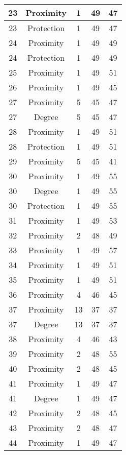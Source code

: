 \documentclass[results.tex]{subfiles}
\begin{document}
\begin{center}
\begin{tabular}{| c || c | c | c | c |}
    \hline
    23 & Proximity & 1 & 49 & 47 \\ 
    \hline
    23 & Protection & 1 & 49 & 47 \\ 
    \hline
    24 & Proximity & 1 & 49 & 49 \\ 
    \hline
    24 & Protection & 1 & 49 & 49 \\ 
    \hline
    25 & Proximity & 1 & 49 & 51 \\ 
    \hline
    26 & Proximity & 1 & 49 & 45 \\ 
    \hline
    27 & Proximity & 5 & 45 & 47 \\ 
    \hline
    27 & Degree & 5 & 45 & 47 \\ 
    \hline
    28 & Proximity & 1 & 49 & 51 \\ 
    \hline
    28 & Protection & 1 & 49 & 51 \\ 
    \hline
    29 & Proximity & 5 & 45 & 41 \\ 
    \hline
    30 & Proximity & 1 & 49 & 55 \\ 
    \hline
    30 & Degree & 1 & 49 & 55 \\ 
    \hline
    30 & Protection & 1 & 49 & 55 \\ 
    \hline
    31 & Proximity & 1 & 49 & 53 \\ 
    \hline
    32 & Proximity & 2 & 48 & 49 \\ 
    \hline
    33 & Proximity & 1 & 49 & 57 \\ 
    \hline
    34 & Proximity & 1 & 49 & 51 \\ 
    \hline
    35 & Proximity & 1 & 49 & 51 \\ 
    \hline
    36 & Proximity & 4 & 46 & 45 \\ 
    \hline
    37 & Proximity & 13 & 37 & 37 \\ 
    \hline
    37 & Degree & 13 & 37 & 37 \\ 
    \hline
    38 & Proximity & 4 & 46 & 43 \\ 
    \hline
    39 & Proximity & 2 & 48 & 55 \\ 
    \hline
    40 & Proximity & 2 & 48 & 45 \\ 
    \hline
    41 & Proximity & 1 & 49 & 47 \\ 
    \hline
    41 & Degree & 1 & 49 & 47 \\ 
    \hline
    42 & Proximity & 2 & 48 & 45 \\ 
    \hline
    43 & Proximity & 2 & 48 & 47 \\ 
    \hline
    44 & Proximity & 1 & 49 & 47 \\ 

\end{tabular}
\end{center}
\end{document}
